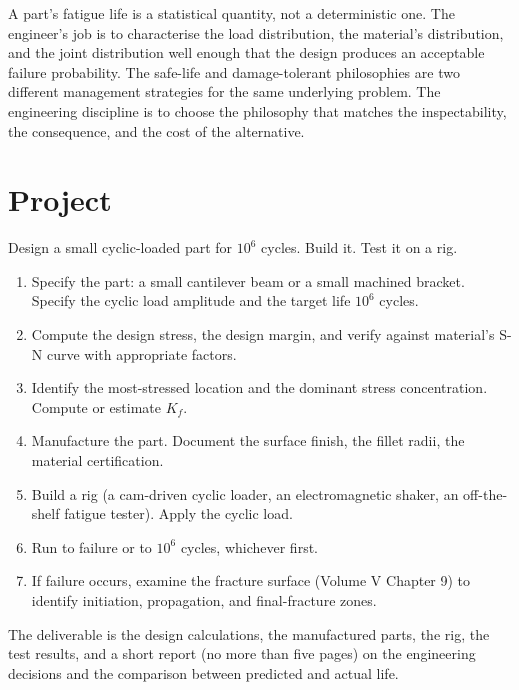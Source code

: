 \begin{principle}
A part's fatigue life is a statistical quantity, not a deterministic one. The engineer's job is to characterise the load distribution, the material's distribution, and the joint distribution well enough that the design produces an acceptable failure probability. The safe-life and damage-tolerant philosophies are two different management strategies for the same underlying problem. The engineering discipline is to choose the philosophy that matches the inspectability, the consequence, and the cost of the alternative.
\end{principle}

\section{Project}

\begin{project}
Design a small cyclic-loaded part for $10^6$ cycles. Build it. Test it on a rig.

\begin{enumerate}[leftmargin=*]
  \item Specify the part: a small cantilever beam or a small machined bracket. Specify the cyclic load amplitude and the target life $10^6$ cycles.
  \item Compute the design stress, the design margin, and verify against material's S-N curve with appropriate factors.
  \item Identify the most-stressed location and the dominant stress concentration. Compute or estimate $K_f$.
  \item Manufacture the part. Document the surface finish, the fillet radii, the material certification.
  \item Build a rig (a cam-driven cyclic loader, an electromagnetic shaker, an off-the-shelf fatigue tester). Apply the cyclic load.
  \item Run to failure or to $10^6$ cycles, whichever first.
  \item If failure occurs, examine the fracture surface (Volume V Chapter 9) to identify initiation, propagation, and final-fracture zones.
\end{enumerate}

The deliverable is the design calculations, the manufactured parts, the rig, the test results, and a short report (no more than five pages) on the engineering decisions and the comparison between predicted and actual life.
\end{project}

